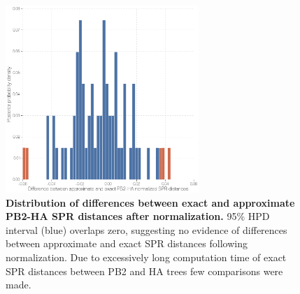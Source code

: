 \documentclass[11pt,oneside,letterpaper]{article}
\begin{document}

\begin{figure}
\centering  
\includegraphics[width=0.65\textwidth]  {supp_figures/InfB_supp_NormPB2-HA_hist.png}
\caption{\textbf{Distribution of differences between exact and approximate PB2-HA SPR distances after normalization.}
95\% HPD interval (blue) overlaps zero, suggesting no evidence of differences between approximate and exact SPR distances following normalization.
Due to excessively long computation time of exact SPR distances between PB2 and HA trees few comparisons were made.}
\label{NormSPR_PB2-HA_difference}
\end{figure}

\end{document}
